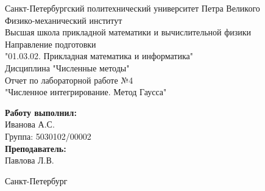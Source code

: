 \begin{titlepage}	%

	\begin{center}		%

		\large Санкт-Петербургский политехнический университет Петра Великого\\
		\large Физико-механический институт \\
		\large Высшая школа прикладной математики и вычислительной физики\\[3cm]
		\large Направление подготовки\\
		\large "01.03.02. Прикладная математика и информатика"\\[3cm]
		\huge Дисциплина "Численные методы"\\[0.5cm] %
		\large Отчет по лабораторной работе №4\\[0.1cm]
		\large "Численное интегрирование. Метод Гаусса"\\[5cm]

	\end{center}


	\begin{flushright} %
		\begin{minipage}{0.25\textwidth} %
			\begin{flushleft} %

				\large\textbf{Работу выполнил:}\\
				\large Иванова А.С.\\
				\large {Группа:} 5030102/00002\\
				
				\large \textbf{Преподаватель:}\\
				\large Павлова Л.В.

			\end{flushleft}
		\end{minipage}
	\end{flushright}
	
	\vfill %

	\begin{center}
	\large Санкт-Петербург\\
	\large \the\year %
	\end{center} %

\end{titlepage} %

\vfill %
